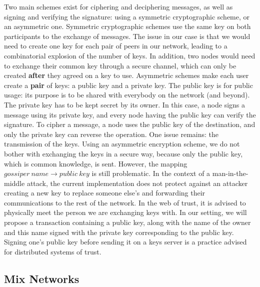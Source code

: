 \documentclass[11pt, a4paper]{article}
\begin{document}
        Two main schemes exist for ciphering and deciphering messages, as well as signing and verifying the signature: using a symmetric cryptographic scheme, or an asymmetric one.
        Symmetric cryptographic schemes use the same key on both participants to the exchange of messages.
        The issue in our case is that we would need to create one key for each pair of peers in our network, leading to a combinatorial explosion of the number of keys.
        In addition, two nodes would need to exchange their common key through a secure channel, which can only be created \textbf{after} they agreed on a key to use.
        \bigbreak
        Asymmetric schemes make each user create a \textbf{pair} of keys: a public key and a private key.
        The public key is for public usage: its purpose is to be shared with everybody on the network (and beyond).
        The private key has to be kept secret by its owner.
        In this case, a node signs a message using its private key, and every node having the public key can verify the signature.
        To cipher a message, a node uses the public key of the destination, and only the private key can reverse the operation.
        \bigbreak
        One issue remains: the transmission of the keys.
        Using an asymmetric encryption scheme, we do not bother with exchanging the keys in a secure way, because only the public key, which is common knowledge, is sent.
        However, the mapping $gossiper~name \rightarrow public~key$ is still problematic.
        In the context of a man-in-the-middle attack, the current implementation does not protect against an attacker creating a new key to replace someone else's and forwarding their communications to the rest of the network.
        In the web of trust, it is advised to physically meet the person we are exchanging keys with.
        In our setting, we will propose a transaction containing a public key, along with the name of the owner and this name signed with the private key corresponding to the public key.
        Signing one's public key before sending it on a keys server is a practice advised for distributed systems of trust.

    \subsection{Mix Networks}
\end{document}
